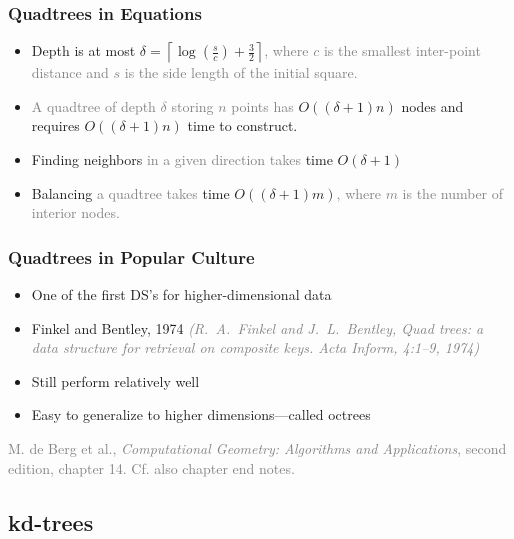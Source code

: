 \documentclass{beamer}
\newcommand\gray[1]{\textcolor{gray}{#1}}
\newcommand\smallgray[1]{\textcolor{gray}{\small\it #1}}
\begin{document}
\begin{frame}
  \frametitle{Quadtrees in Equations}
  
  \begin{itemize}
  \item Depth is at most $\delta = \left\lceil
      \log\left(\frac{s}{c}\right) +
      \frac{3}{2}\right\rceil$\gray{, where $c$ is the
      smallest inter-point distance and $s$ is the side length of the
      initial square.} \\[2mm]
    
  \item \gray{A quadtree of depth $\delta$ storing $n$ points has}
    $O((\delta+1)n)$ nodes and requires $O((\delta+1)n)$ time to
    construct. \\[2mm]
    
  \item Finding neighbors \gray{in a given direction takes}
    time $O(\delta+1)$ \\[2mm]

  \item Balancing \gray{a quadtree takes} time
    $O((\delta+1)m)$\gray{, where $m$ is the number of
      interior nodes.}
  \end{itemize}
\end{frame}

\begin{frame}
  \frametitle{Quadtrees in Popular Culture}

  \begin{itemize}
  \item One of the first DS's for higher-dimensional data
  \item Finkel and Bentley, 1974
    \smallgray{(R.~A.~Finkel and J.~L.~Bentley, Quad
      trees: a data structure for retrieval on composite keys. Acta
      Inform, 4:1--9, 1974)}
  \item Still perform relatively well
  \item Easy to generalize to higher dimensions---called octrees
  \end{itemize}

  \bigskip \gray{M. de Berg et al., \textit{Computational
      Geometry: Algorithms and Applications}, second edition, chapter
    14.  Cf. also chapter end notes.}
\end{frame}

\subsection{kd-trees}
\end{document}

